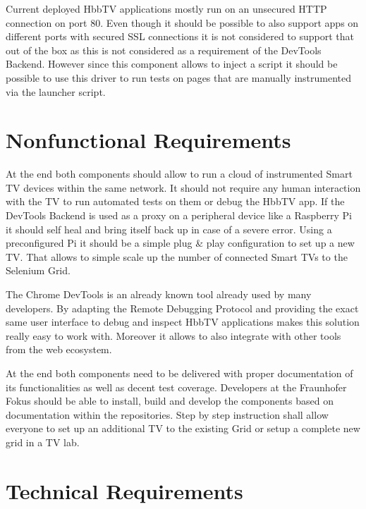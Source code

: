 Current deployed HbbTV applications mostly run on an unsecured HTTP connection on port 80.
Even though it should be possible to also support apps on different ports with secured SSL
connections it is not considered to support that out of the box as this is not considered
as a requirement of the DevTools Backend. However since this component allows to inject a
script it should be possible to use this driver to run tests on pages that are manually
instrumented via the launcher script.

\section{Nonfunctional Requirements\label{sec:techreq}}

At the end both components should allow to run a cloud of instrumented Smart TV devices
within the same network. It should not require any human interaction with the TV to run
automated tests on them or debug the HbbTV app. If the DevTools Backend is used as a
proxy on a peripheral device like a Raspberry Pi it should self heal and bring itself back
up in case of a severe error. Using a preconfigured Pi it should be a simple plug \& play
configuration to set up a new TV. That allows to simple scale up the number of connected
Smart TVs to the Selenium Grid.

The Chrome DevTools is an already known tool already used by many developers. By adapting
the Remote Debugging Protocol and providing the exact same user interface to debug and inspect
HbbTV applications makes this solution really easy to work with. Moreover it allows to
also integrate with other tools from the web ecosystem.

At the end both components need to be delivered with proper documentation of its
functionalities as well as decent test coverage. Developers at the Fraunhofer Fokus should
be able to install, build and develop the components based on documentation within the
repositories. Step by step instruction shall allow everyone to set up an additional TV
to the existing Grid or setup a complete new grid in a TV lab.

\section{Technical Requirements\label{sec:techreq}}

